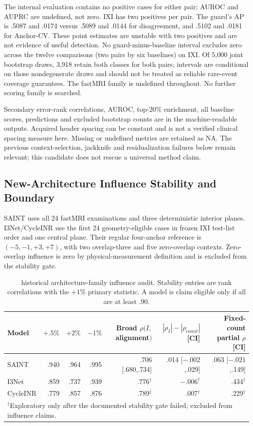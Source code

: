 

The internal evaluation contains no positive cases for either pair; AUROC and AUPRC are undefined, not zero. IXI has two positives per pair. The guard's AP is .5087 and .0174 versus .5089 and .0144 for disagreement, and .5102 and .0181 for Anchor-CV. These point estimates are unstable with two positives and are not evidence of useful detection. No guard-minus-baseline interval excludes zero across the twelve comparisons (two pairs by six baselines) on IXI. Of 5,000 joint bootstrap draws, 3,918 retain both classes for both pairs; intervals are conditional on those nondegenerate draws and should not be treated as reliable rare-event coverage guarantees. The fastMRI family is undefined throughout. No further scoring family is searched.

Secondary error-rank correlations, AUROC, top-20\% enrichment, all baseline scores, predictions and excluded bootstrap counts are in the machine-readable outputs. Acquired header spacing can be constant and is not a verified clinical spacing measure here. Missing or undefined metrics are retained as NA. The previous context-selection, jackknife and residualization failures below remain relevant; this candidate does not rescue a universal method claim.

\subsection{New-Architecture Influence Stability and Boundary}
SAINT uses all 24 fastMRI examinations and three deterministic interior planes. I3Net/CycleINR use the first 24 geometry-eligible cases in frozen IXI test-list order and one central plane. Their regular four-anchor reference is $(-5,-1,+3,+7)$, with two overlap-three and five zero-overlap contexts. Zero-overlap influence is zero by physical-measurement definition and is excluded from the stability gate.

\begin{table}[t]
\centering
\caption{historical architecture-family influence audit. Stability entries are rank correlations with the $+1\%$ primary statistic. A model is claim eligible only if all are at least .90.}
\label{tab:p9-influence}
\setlength{\tabcolsep}{4pt}
\begin{tabular}{lrrrrrr}
\toprule
Model & $+.5\%$ & $+2\%$ & $-1\%$ & Broad $\rho(I,$alignment$)$ & $|\rho_I|-|\rho_{count}|$ [CI] & Fixed-count partial $\rho$ [CI]\\
\midrule
SAINT & .940 & .964 & .995 & .706 [.680,.734] & .014 [$-.002$,.029] & .063 [$-.021$,.149]\\
I3Net & .859 & .737 & .939 & .776$^{\dagger}$ & $-.006^{\dagger}$ & .434$^{\dagger}$\\
CycleINR & .779 & .857 & .876 & .789$^{\dagger}$ & .007$^{\dagger}$ & .229$^{\dagger}$\\
\bottomrule
\multicolumn{7}{l}{$^{\dagger}$Exploratory only after the documented stability gate failed; excluded from influence claims.}
\end{tabular}
\end{table}

